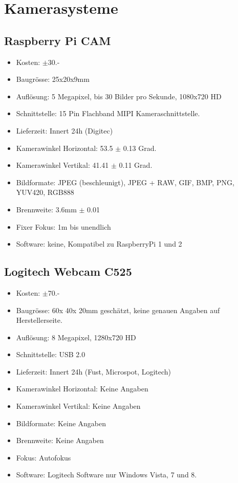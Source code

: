 \section{Kamerasysteme}
\subsection{Raspberry Pi CAM}
\begin{itemize}
\item Kosten: $\pm$30.-
\item Baugrösse: 25x20x9mm
\item Auflösung: 5 Megapixel, bis 30 Bilder pro Sekunde, 1080x720 HD
\item Schnittstelle: 15 Pin Flachband MIPI Kameraschnittstelle.
\item Lieferzeit: Innert 24h (Digitec)
\item Kamerawinkel Horizontal: 53.5 $\pm$ 0.13 Grad.
\item Kamerawinkel Vertikal: 41.41 $\pm$ 0.11 Grad.
\item Bildformate: JPEG (beschleunigt), JPEG + RAW, GIF, BMP, PNG, YUV420, RGB888
\item Brennweite: 3.6mm $\pm$ 0.01
\item Fixer Fokus: 1m bis unendlich
\item Software: keine, Kompatibel zu RaspberryPi 1 und 2
\end{itemize}
\subsection{Logitech Webcam C525}
\begin{itemize}
\item Kosten: $\pm$70.-
\item Baugrösse: 60x 40x 20mm geschätzt, keine genauen Angaben auf Herstellerseite.
\item Auflösung: 8 Megapixel, 1280x720 HD
\item Schnittstelle: USB 2.0
\item Lieferzeit: Innert 24h (Fust, Microspot, Logitech)
\item Kamerawinkel Horizontal: Keine Angaben
\item Kamerawinkel Vertikal: Keine Angaben
\item Bildformate: Keine Angaben
\item Brennweite: Keine Angaben
\item Fokus: Autofokus
\item Software: Logitech Software nur Windows Vista, 7 und 8.
\end{itemize}
